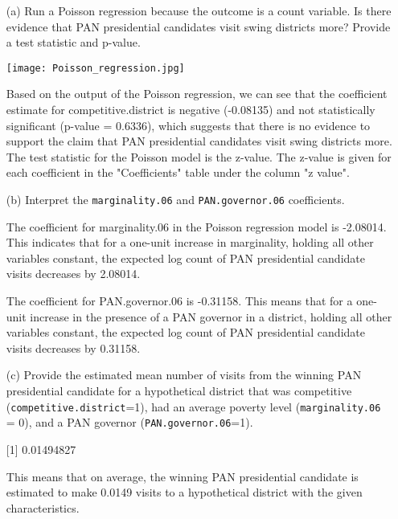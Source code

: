 \documentclass[12pt,letterpaper]{article}
\begin{document}
\begin{enumerate}
	\item [(a)]
	Run a Poisson regression because the outcome is a count variable. Is there evidence that PAN presidential candidates visit swing districts more? Provide a test statistic and p-value.
 
\texttt{[image: Poisson\_regression.jpg]}

Based on the output of the Poisson regression, we can see that the coefficient estimate for competitive.district is negative (-0.08135) and not statistically significant (p-value = 0.6336), which suggests that there is no evidence to support the claim that PAN presidential candidates visit swing districts more. The test statistic for the Poisson model is the z-value. The z-value is given for each coefficient in the "Coefficients" table under the column "z value". 
	\item [(b)]
	Interpret the \texttt{marginality.06} and \texttt{PAN.governor.06} coefficients.
	
	The coefficient for marginality.06 in the Poisson regression model is -2.08014. This indicates that for a one-unit increase in marginality, holding all other variables constant, the expected log count of PAN presidential candidate visits decreases by 2.08014. 
	
	The coefficient for PAN.governor.06 is -0.31158. This means that for a one-unit increase in the presence of a PAN governor in a district, holding all other variables constant, the expected log count of PAN presidential candidate visits decreases by 0.31158.
	
	\item [(c)]
	Provide the estimated mean number of visits from the winning PAN presidential candidate for a hypothetical district that was competitive (\texttt{competitive.district}=1), had an average poverty level (\texttt{marginality.06} = 0), and a PAN governor (\texttt{PAN.governor.06}=1).
	 
	
	[1] 0.01494827
	
	This means that on average, the winning PAN presidential candidate is estimated to make 0.0149 visits to a hypothetical district with the given characteristics.
	
	
	
\end{enumerate}
\end{document}
